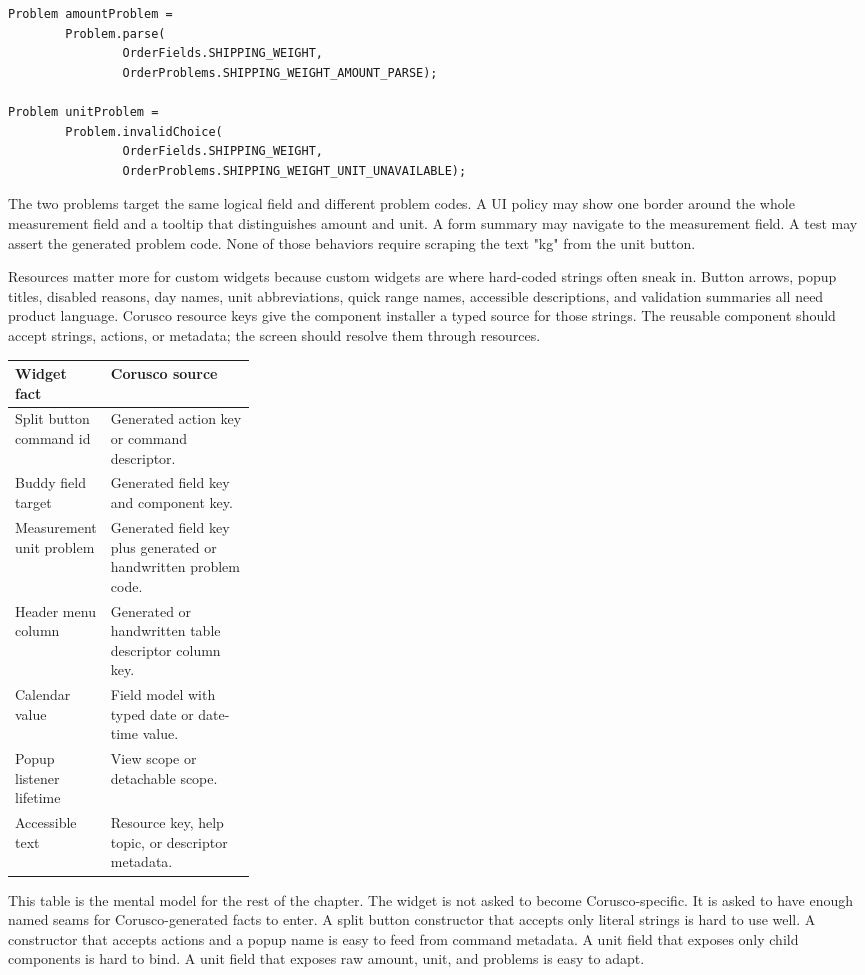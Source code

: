 \begin{lstlisting}[caption={A problem target should name the field contract.}]
Problem amountProblem =
        Problem.parse(
                OrderFields.SHIPPING_WEIGHT,
                OrderProblems.SHIPPING_WEIGHT_AMOUNT_PARSE);

Problem unitProblem =
        Problem.invalidChoice(
                OrderFields.SHIPPING_WEIGHT,
                OrderProblems.SHIPPING_WEIGHT_UNIT_UNAVAILABLE);
\end{lstlisting}

The two problems target the same logical field and different problem codes. A UI policy
may show one border around the whole measurement field and a tooltip that distinguishes
amount and unit. A form summary may navigate to the measurement field. A test may assert
the generated problem code. None of those behaviors require scraping the text "kg" from
the unit button.

Resources matter more for custom widgets because custom widgets are where hard-coded
strings often sneak in. Button arrows, popup titles, disabled reasons, day names, unit
abbreviations, quick range names, accessible descriptions, and validation summaries all
need product language. Corusco resource keys give the component installer a typed source
for those strings. The reusable component should accept strings, actions, or metadata;
the screen should resolve them through resources.

\begin{tabularx}{0.96\linewidth}{@{}p{0.28\linewidth}X@{}}
\toprule
Widget fact & Corusco source\\
\midrule
Split button command id & Generated action key or command descriptor.\\
Buddy field target & Generated field key and component key.\\
Measurement unit problem & Generated field key plus generated or handwritten problem code.\\
Header menu column & Generated or handwritten table descriptor column key.\\
Calendar value & Field model with typed date or date-time value.\\
Popup listener lifetime & View scope or detachable scope.\\
Accessible text & Resource key, help topic, or descriptor metadata.\\
\bottomrule
\end{tabularx}

This table is the mental model for the rest of the chapter. The widget is not asked to
become Corusco-specific. It is asked to have enough named seams for Corusco-generated
facts to enter. A split button constructor that accepts only literal strings is hard to
use well. A constructor that accepts actions and a popup name is easy to feed from
command metadata. A unit field that exposes only child components is hard to bind. A
unit field that exposes raw amount, unit, and problems is easy to adapt.

